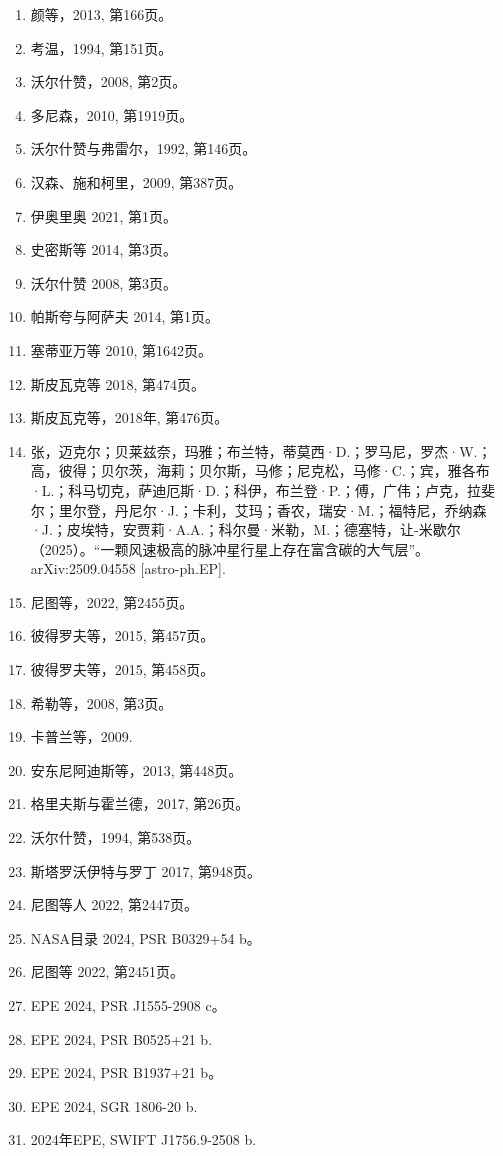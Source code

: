 \begin{enumerate}
\item 颜等，2013, 第166页。
\item 考温，1994, 第151页。
\item 沃尔什赞，2008, 第2页。
\item 多尼森，2010, 第1919页。
\item 沃尔什赞与弗雷尔，1992, 第146页。
\item 汉森、施和柯里，2009, 第387页。
\item 伊奥里奥 2021, 第1页。
\item 史密斯等 2014, 第3页。
\item 沃尔什赞 2008, 第3页。
\item 帕斯夸与阿萨夫 2014, 第1页。
\item 塞蒂亚万等 2010, 第1642页。
\item 斯皮瓦克等 2018, 第474页。
\item 斯皮瓦克等，2018年, 第476页。
\item 张，迈克尔；贝莱兹奈，玛雅；布兰特，蒂莫西·D.；罗马尼，罗杰·W.；高，彼得；贝尔茨，海莉；贝尔斯，马修；尼克松，马修·C.；宾，雅各布·L.；科马切克，萨迪厄斯·D.；科伊，布兰登·P.；傅，广伟；卢克，拉斐尔；里尔登，丹尼尔·J.；卡利，艾玛；香农，瑞安·M.；福特尼，乔纳森·J.；皮埃特，安贾莉·A.A.；科尔曼·米勒，M.；德塞特，让-米歇尔（2025）。“一颗风速极高的脉冲星行星上存在富含碳的大气层”。arXiv:2509.04558 [astro-ph.EP].
\item 尼图等，2022, 第2455页。
\item 彼得罗夫等，2015, 第457页。
\item 彼得罗夫等，2015, 第458页。
\item 希勒等，2008, 第3页。
\item 卡普兰等，2009.
\item 安东尼阿迪斯等，2013, 第448页。
\item 格里夫斯与霍兰德，2017, 第26页。
\item 沃尔什赞，1994, 第538页。
\item 斯塔罗沃伊特与罗丁 2017, 第948页。
\item 尼图等人 2022, 第2447页。
\item NASA目录 2024, PSR B0329+54 b。
\item 尼图等 2022, 第2451页。
\item EPE 2024, PSR J1555-2908 c。
\item EPE 2024, PSR B0525+21 b.
\item EPE 2024, PSR B1937+21 b。
\item EPE 2024, SGR 1806-20 b.
\item 2024年EPE, SWIFT J1756.9-2508 b.

\end{enumerate}
